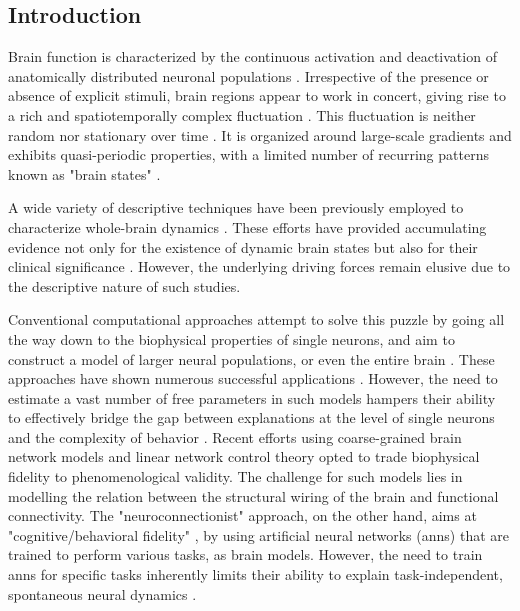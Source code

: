 \documentclass{article}
\begin{document}
\subsection{Introduction}

Brain function is characterized by the continuous activation and deactivation of anatomically distributed neuronal
populations \citep{buzsaki2006rhythms}.
Irrespective of the presence or absence of explicit stimuli, brain regions appear to work in concert, giving rise to a
rich and spatiotemporally complex fluctuation \citep{bassett2017network}.
This fluctuation is neither random nor stationary over time \citep{liu2013time, zalesky2014time}.
It is organized around large-scale gradients \citep{margulies2016situating, huntenburg2018large} and exhibits quasi-periodic properties, with a limited number of recurring patterns known as "brain states" \citep{greene2023everyone, vidaurre2017brain, liu2013time}.

A wide variety of descriptive techniques have been previously employed to characterize whole-brain dynamics \citep{smith2012temporally, vidaurre2017brain, liu2013time, chen2018human}.
These efforts have provided accumulating evidence not only for the existence of dynamic brain states but also for their clinical
significance \citep{hutchison2013dynamic, barttfeld2015signature, meer2020movie}.
However, the underlying driving forces remain elusive due to the descriptive nature of such studies.

Conventional computational approaches attempt to solve this puzzle by going all the way down to the biophysical properties of single neurons, and aim to construct a model of larger neural populations, or even the entire brain
\citep{breakspear2017dynamic}.
These approaches have shown numerous successful applications \citep{murray2018biophysical, kriegeskorte2018cognitive, heinz2019towards}.
However, the need to estimate a vast number of free parameters in such models hampers their ability to effectively bridge the gap between explanations at the level of single neurons and the complexity of behavior \citep{breakspear2017dynamic}.
Recent efforts using coarse-grained brain network models \citep{schirner2022dynamic, schiff1994controlling, papadopoulos2017development, seguin2023brain} and linear network control theory  \citep{chiem2021structure, scheid2021time, gu2015controllability} opted to trade biophysical fidelity to phenomenological validity. The challenge for such models lies in modelling the relation between the structural wiring of the brain and functional connectivity.
The "neuroconnectionist" approach, on the other hand, \citep{doerig2023neuroconnectionist} aims at "cognitive/behavioral fidelity" \citep{kriegeskorte2018cognitive}, by using artificial neural networks (\acrshort{ann}s) that are trained to perform various tasks, as brain models. However, the need to train \acrshort{ann}s for specific tasks inherently limits their ability to explain task-independent, spontaneous neural dynamics \citep{richards2019deep}.
\end{document}
